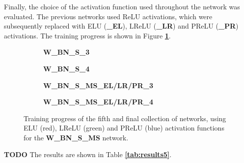 Finally, the choice of the activation function used throughout the network was evaluated. The previous networks used ReLU activations, which were subsequently replaced with ELU (\textbf{\_EL}), LReLU (\textbf{\_LR}) and PReLU (\textbf{\_PR}) activations. The training progress is shown in Figure \textbf{\ref{fig:weighted_batchnorm_shuffle_msra_acts_training}}.\\

\begin {figure}[!htb]
	\begin {subfigure}[b]{0.4\linewidth}
		\scalebox{0.65}{}
		\caption{\textbf{W\_BN\_S\_3}}
	\end {subfigure}\hspace{1.75cm}
	\begin {subfigure}[b]{0.4\linewidth}
		\scalebox{0.65}{}
		\caption{\textbf{W\_BN\_S\_4}}
	\end {subfigure}

	\begin {subfigure}[b]{0.4\linewidth}
		\scalebox{0.65}{}
		\caption{\textbf{W\_BN\_S\_MS\_EL/LR/PR\_3}}
	\end {subfigure}\hspace{1.75cm}
	\begin {subfigure}[b]{0.4\linewidth}
		\scalebox{0.65}{}
		\caption{\textbf{W\_BN\_S\_MS\_EL/LR/PR\_4}}
	\end {subfigure}

		\caption[Training progress of the fifth collection of networks.]{Training progress of the fifth and final collection of networks, using ELU (red), LReLU (green) and PReLU (blue) activation functions for the \textbf{W\_BN\_S\_MS} network.}
		\label{fig:weighted_batchnorm_shuffle_msra_acts_training}
\end {figure}

\textbf{TODO} The results are shown in Table \textbf{\ref{tab:results5}}. \\

